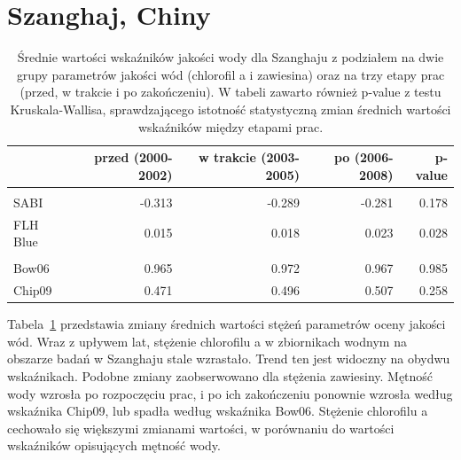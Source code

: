 \documentclass{amuthesis}
\begin{document}
\hypertarget{szanghaj-chiny-1}{%
\section{Szanghaj, Chiny}\label{szanghaj-chiny-1}}

\hypertarget{tbl-cn_stats}{}
\begin{table}
\caption{\label{tbl-cn_stats}Średnie wartości wskaźników jakości wody dla Szanghaju z podziałem na
dwie grupy parametrów jakości wód (chlorofil a i zawiesina) oraz na trzy
etapy prac (przed, w trakcie i po zakończeniu). W tabeli zawarto również
p-value z testu Kruskala-Wallisa, sprawdzającego istotność statystyczną
zmian średnich wartości wskaźników między etapami prac. }\tabularnewline

\centering
\begin{tabular}{lrrrr}
\toprule
  & przed (2000-2002) & w trakcie (2003-2005) & po (2006-2008) & p-value\\
\midrule
\addlinespace[0.3em]
\multicolumn{5}{l}{\textbf{chlorofil a}}\\
\hspace{1em}SABI & -0.313 & -0.289 & -0.281 & 0.178\\
\hspace{1em}FLH Blue & 0.015 & 0.018 & 0.023 & 0.028\\
\addlinespace[0.3em]
\multicolumn{5}{l}{\textbf{zawiesina}}\\
\hspace{1em}Bow06 & 0.965 & 0.972 & 0.967 & 0.985\\
\hspace{1em}Chip09 & 0.471 & 0.496 & 0.507 & 0.258\\
\bottomrule
\end{tabular}
\end{table}

Tabela~\ref{tbl-cn_stats} przedstawia zmiany średnich wartości stężeń
parametrów oceny jakości wód. Wraz z upływem lat, stężenie chlorofilu a
w zbiornikach wodnym na obszarze badań w Szanghaju stale wzrastało.
Trend ten jest widoczny na obydwu wskaźnikach. Podobne zmiany
zaobserwowano dla stężenia zawiesiny. Mętność wody wzrosła po
rozpoczęciu prac, i po ich zakończeniu ponownie wzrosła według wskaźnika
Chip09, lub spadła według wskaźnika Bow06. Stężenie chlorofilu a
cechowało się większymi zmianami wartości, w porównaniu do wartości
wskaźników opisujących mętność wody.
\end{document}
